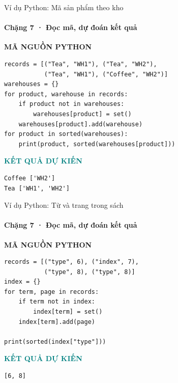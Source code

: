 \documentclass[aspectratio=169,10pt]{beamer}
\begin{document}
\begin{frame}[fragile,t]{Ví dụ Python: Mã sản phẩm theo kho}
\framesubtitle{Chặng 7 · Đọc mã, dự đoán kết quả}
\vspace{-1mm}
{\small\color{muted}\textbf{MÃ NGUỒN PYTHON}}\par\vspace{1mm}
\begin{Verbatim}[fontsize=\scriptsize,frame=single,framesep=4mm,rulecolor=\color{teal!35},breaklines=true]
records = [("Tea", "WH1"), ("Tea", "WH2"),
           ("Tea", "WH1"), ("Coffee", "WH2")]
warehouses = {}
for product, warehouse in records:
    if product not in warehouses:
        warehouses[product] = set()
    warehouses[product].add(warehouse)
for product in sorted(warehouses):
    print(product, sorted(warehouses[product]))
\end{Verbatim}
\vspace{1mm}\textcolor{teal}{\scriptsize\textbf{KẾT QUẢ DỰ KIẾN}}
\begin{Verbatim}[fontsize=\scriptsize,breaklines=true]
Coffee ['WH2']
Tea ['WH1', 'WH2']
\end{Verbatim}

\end{frame}

\begin{frame}[fragile,t]{Ví dụ Python: Từ và trang trong sách}
\framesubtitle{Chặng 7 · Đọc mã, dự đoán kết quả}
\vspace{-1mm}
{\small\color{muted}\textbf{MÃ NGUỒN PYTHON}}\par\vspace{1mm}
\begin{Verbatim}[fontsize=\scriptsize,frame=single,framesep=4mm,rulecolor=\color{teal!35},breaklines=true]
records = [("type", 6), ("index", 7),
           ("type", 8), ("type", 8)]
index = {}
for term, page in records:
    if term not in index:
        index[term] = set()
    index[term].add(page)

print(sorted(index["type"]))
\end{Verbatim}
\vspace{1mm}\textcolor{teal}{\scriptsize\textbf{KẾT QUẢ DỰ KIẾN}}
\begin{Verbatim}[fontsize=\scriptsize,breaklines=true]
[6, 8]
\end{Verbatim}

\end{frame}
\end{document}
